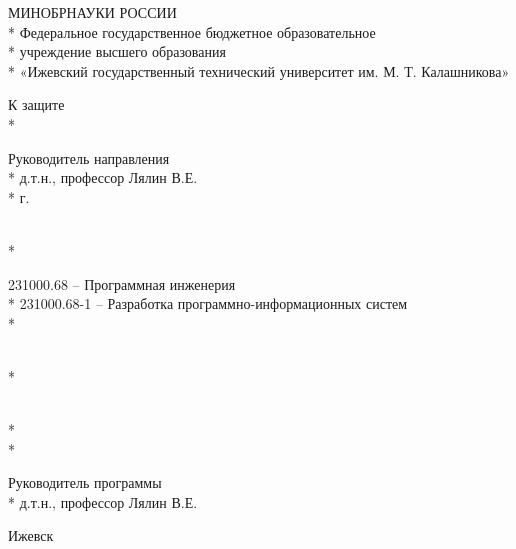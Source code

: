 \begin{titlepage}

\thispagestyle{empty}

\begin{center}
\large
МИНОБРНАУКИ РОССИИ\\*
Федеральное государственное бюджетное образовательное\\*
учреждение высшего образования\\*
«Ижевский государственный технический университет им. М. Т. Калашникова»
\vspace{1cm}
\end{center}

\hfill
\begin{minipage}{0.3\textwidth}
К защите\\*

Руководитель направления\\*
д.т.н., профессор Лялин В.Е.\\*
\text{\mydate} \text{\mymonth} \text{\myyear} г.
\end{minipage}

\vspace{6em}

\begin{center}
\textbf{\mynamefull}\\*
\vspace{1em}
\MakeUppercase{\titletext}
\end{center}

\vspace{1em}

\begin{center}
231000.68 – Программная инженерия\\*
231000.68-1 – Разработка программно-информационных систем\\*

\vspace{1em}

\titletype
\end{center}

\vspace{\fill}

\hfill
\begin{minipage}{0.3\textwidth}
\mylabel\\*
\myname

\vspace{1em}

\myteacherlabel\\*
\myteacherdegree\\*
\myteacher

\vspace{1em}

Руководитель программы\\*
д.т.н., профессор Лялин В.Е.

\vspace{1em}
\end{minipage}

\begin{center}
    Ижевск \myyear
\end{center}

\end{titlepage}

\setcounter{page}{2}
\pagestyle{plain}
